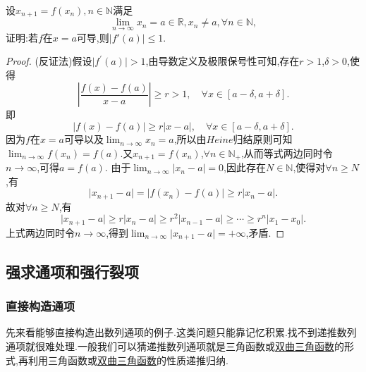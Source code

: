 \documentclass[lang=cn,newtx,10pt,scheme=chinese]{elegantbook}
\begin{document}
\begin{proposition}[反向压缩映像]\label{proposition:反向压缩映像}
设\(x_{n + 1} = f(x_n),n\in\mathbb{N}\)满足
\[
\lim_{n \to \infty} x_n = a\in\mathbb{R},x_n\neq a,\forall n\in\mathbb{N},
\]
证明:若\(f\)在\(x = a\)可导,则\(\vert f'(a)\vert\leq 1\).
\end{proposition}
\begin{proof}
   (反证法)假设\(\vert f^\prime(a)\vert > 1\),由导数定义及极限保号性可知,存在\(r > 1\),\(\delta > 0\),使得
   \[
   \left\vert\frac{f(x) - f(a)}{x - a}\right\vert\geqslant r > 1, \quad\forall x\in [a - \delta, a + \delta].
   \]
   即
   \[
   \vert f(x) - f(a)\vert\geqslant r\vert x - a\vert, \quad\forall x\in [a - \delta, a + \delta].
   \]
   因为\(f\)在\(x = a\)可导以及\(\lim_{n\rightarrow\infty}x_n = a\),所以由\(Heine\)归结原则可知\(\lim_{n\rightarrow\infty}f(x_n) = f(a)\).又\(x_{n + 1} = f(x_n)\),\(\forall n\in\mathbb{N}_+\),从而等式两边同时令\(n\rightarrow\infty\),可得\(a = f(a)\).
   由于\(\lim_{n\rightarrow\infty}\vert x_n - a\vert = 0\),因此存在\(N\in\mathbb{N}\),使得对\(\forall n\geqslant N\),有
   \[
   \vert x_{n + 1} - a\vert = \vert f(x_n) - f(a)\vert\geqslant r\vert x_n - a\vert.
   \]
   故对\(\forall n\geqslant N\),有
   \[
   \vert x_{n + 1} - a\vert\geqslant r\vert x_n - a\vert\geqslant r^2\vert x_{n - 1} - a\vert\geqslant\cdots\geqslant r^n\vert x_1 - x_0\vert.
   \]
   上式两边同时令\(n\rightarrow\infty\),得到\(\lim_{n\rightarrow\infty}\vert x_{n + 1} - a\vert = +\infty\),矛盾.
\end{proof}


\subsection{强求通项和强行裂项}

\subsubsection{直接构造通项}

先来看能够直接构造出数列通项的例子.这类问题只能靠记忆积累.找不到递推数列通项就很难处理.一般我们可以猜递推数列通项就是三角函数或\href{https://baike.baidu.com/item/%E5%8F%8C%E6%9B%B2%E5%87%BD%E6%95%B0/8704306}{双曲三角函数}的形式,再利用三角函数或\href{https://baike.baidu.com/item/%E5%8F%8C%E6%9B%B2%E5%87%BD%E6%95%B0/8704306}{双曲三角函数}的性质递推归纳.
\end{document}
